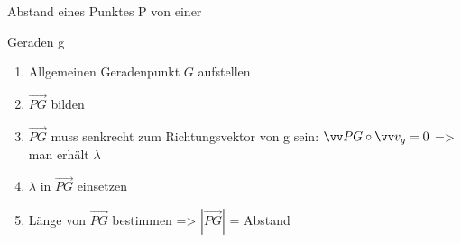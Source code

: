 \documentclass[paper=a6,landscape,ngerman,twoside=true,fontsize=12pt]{scrartcl}
\begin{document}
\begin{frage}
	\LARGE
	 Abstand eines Punktes P von einer 
	 
	 Geraden g
	
\end{frage}
\begin{antwort}
	\begin{enumerate} 
		\item Allgemeinen Geradenpunkt $G$ aufstellen
		\item $\vec{PG}$ bilden
		\item $\vec{PG}$ muss senkrecht zum Richtungsvektor von g sein: $\vec{PG} \mal \vec{v_g}=0$ => man erhält $\lambda$
		
		\item $\lambda$ in  $\vec{PG}$ einsetzen
		\item Länge von $\vec{PG}$ bestimmen => $|\vec{PG}|$ = Abstand 
		
	\end{enumerate} 

	
\end{antwort}			
\end{document}
